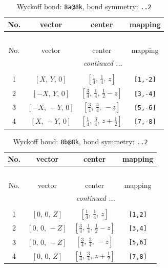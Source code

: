 \documentclass[fleqn,8pt]{jsarticle}
\begin{document}
\begin{longtable}{cccc}
\caption{Wyckoff bond: {\tt 8a@8k}, bond symmetry: {\tt ..2}}
 \\
 \hline \hline
No. & vector & center & mapping \\ \hline \endfirsthead

\multicolumn{3}{l}{\tablename\ \thetable{}} \\
 \hline \hline
No. & vector & center & mapping \\ \hline \endhead

 \hline \hline
\multicolumn{3}{r}{\footnotesize\it continued ...} \\ \endfoot

 \hline \hline
\multicolumn{3}{r}{} \\ \endlastfoot

1 & $\left[ X,\, Y,\, 0 \right]$ & $\left[ \frac{1}{4},\, \frac{1}{4},\, z \right]$ & {\tt [1,-2]} \\ \hline
2 & $\left[ - X,\, Y,\, 0 \right]$ & $\left[ \frac{3}{4},\, \frac{1}{4},\, \frac{1}{2} - z \right]$ & {\tt [3,-4]} \\ \hline
3 & $\left[ - X,\, - Y,\, 0 \right]$ & $\left[ \frac{3}{4},\, \frac{3}{4},\, - z \right]$ & {\tt [5,-6]} \\ \hline
4 & $\left[ X,\, - Y,\, 0 \right]$ & $\left[ \frac{1}{4},\, \frac{3}{4},\, z + \frac{1}{2} \right]$ & {\tt [7,-8]} \\
\end{longtable}
\renewcommand{\arraystretch}{1.2}
\begin{longtable}{cccc}
\caption{Wyckoff bond: {\tt 8b@8k}, bond symmetry: {\tt ..2}}
 \\
 \hline \hline
No. & vector & center & mapping \\ \hline \endfirsthead

\multicolumn{3}{l}{\tablename\ \thetable{}} \\
 \hline \hline
No. & vector & center & mapping \\ \hline \endhead

 \hline \hline
\multicolumn{3}{r}{\footnotesize\it continued ...} \\ \endfoot

 \hline \hline
\multicolumn{3}{r}{} \\ \endlastfoot

1 & $\left[ 0,\, 0,\, Z \right]$ & $\left[ \frac{1}{4},\, \frac{1}{4},\, z \right]$ & {\tt [1,2]} \\ \hline
2 & $\left[ 0,\, 0,\, - Z \right]$ & $\left[ \frac{3}{4},\, \frac{1}{4},\, \frac{1}{2} - z \right]$ & {\tt [3,4]} \\ \hline
3 & $\left[ 0,\, 0,\, - Z \right]$ & $\left[ \frac{3}{4},\, \frac{3}{4},\, - z \right]$ & {\tt [5,6]} \\ \hline
4 & $\left[ 0,\, 0,\, Z \right]$ & $\left[ \frac{1}{4},\, \frac{3}{4},\, z + \frac{1}{2} \right]$ & {\tt [7,8]} \\
\end{longtable}
\end{document}
